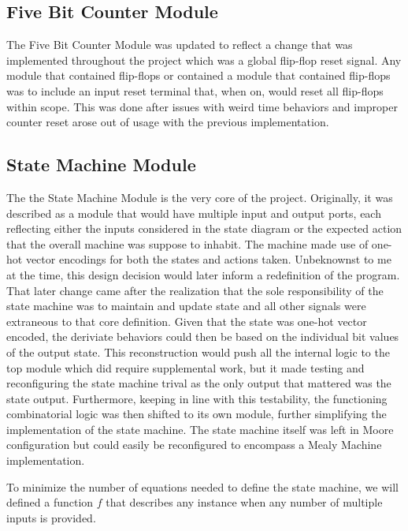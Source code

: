\documentclass[stu,12pt,floatsintext]{apa7}
\begin{document}
\subsection{Five Bit Counter Module}

The Five Bit Counter Module was updated to reflect a change that was implemented throughout the project which was a global flip-flop reset signal. Any module that contained flip-flops or contained a module that contained flip-flops was to include an input reset terminal that, when on, would reset all flip-flops within scope. This was done after issues with weird time behaviors and improper counter reset arose out of usage with the previous implementation.

\subsection{State Machine Module}

The the State Machine Module is the very core of the project. Originally, it was described as a module that would have multiple input and output ports, each reflecting either the inputs considered in the state diagram or the expected action that the overall machine was suppose to inhabit. The machine made use of one-hot vector encodings for both the states and actions taken. Unbeknownst to me at the time, this design decision would later inform a redefinition of the program. That later change came after the realization that the sole responsibility of the state machine was to maintain and update state and all other signals were extraneous to that core definition. Given that the state was one-hot vector encoded, the deriviate behaviors could then be based on the individual bit values of the output state. This reconstruction would push all the internal logic to the top module which did require supplemental work, but it made testing and reconfiguring the state machine trival as the only output that mattered was the state output. Furthermore, keeping in line with this testability, the functioning combinatorial logic was then shifted to its own module, further simplifying the implementation of the state machine. The state machine itself was left in Moore configuration but could easily be reconfigured to encompass a Mealy Machine implementation.

To minimize the number of equations needed to define the state machine, we will defined a function \(f\) that describes any instance when any number of multiple inputs is provided.
\end{document}

